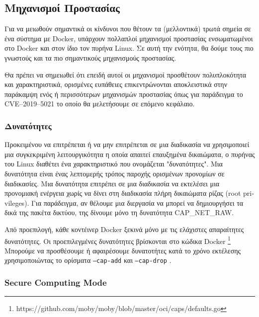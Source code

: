 \subsection{Μηχανισμοί Προστασίας}

Για να μειωθούν σημαντικά οι κίνδυνοι που θέτουν τα (μελλοντικά) τρωτά σημεία
σε ένα σύστημα με \textlatin{Docker}, υπάρχουν πολλαπλοί μηχανισμοί προστασίας
ενσωματωμένοι στο \textlatin{Docker} και στον ίδιο τον πυρήνα \textlatin{Linux}.
Σε αυτή την ενότητα, θα δούμε τους πιο γνωστούς και τα πιο σημαντικούς
μηχανισμούς προστασίας.

Θα πρέπει να σημειωθεί ότι επειδή αυτοί οι μηχανισμοί προσθέτουν πολυπλοκότητα
και χαρακτηριστικά, ορισμένες ευπάθειες επικεντρώνονται αποκλειστικά στην
παράκαμψη ενός ή περισσότερων μηχανισμών προστασίας όπως για παράδειγμα το
\textlatin{CVE–2019–5021} το οποίο θα μελετήσουμε σε επόμενο κεφάλαιο.

\subsubsection{Δυνατότητες}

Προκειμένου να επιτρέπεται ή να μην επιτρέπεται σε μια διαδικασία να χρησιμοποιεί μια
συγκεκριμένη λειτουργικότητα η οποία απαιτεί επαυξημένα δικαιώματα,
ο πυρήνας του \textlatin{Linux} διαθέτει ένα χαρακτηριστικό που ονομάζεται
"δυνατότητες". Μια δυνατότητα είναι ένας λεπτομερής τρόπος παροχής ορισμένων
προνομίων σε διαδικασίες. Μια δυνατότητα επιτρέπει σε μια διαδικασία να
εκτελέσει μια προνομιακή ενέργεια χωρίς να δίνει στη διαδικασία πλήρη
δικαιώματα ρίζας (\textlatin{root privileges}). Για παράδειγμα, αν θέλουμε μια
διεργασία να μπορεί να δημιουργήσει τα δικά της πακέτα δικτύου, της δίνουμε
μόνο τη δυνατότητα \textlatin{CAP\_NET\_RAW}.

Από προεπιλογή, κάθε κοντέινερ \textlatin{Docker} ξεκινά μόνο με τις ελάχιστες
απαραίτητες δυνατότητες. Οι προεπιλεγμένες δυνατότητες βρίσκονται στο κώδικα
\textlatin{Docker}
\footnote{\textlatin{https://github.com/moby/moby/blob/master/oci/caps/defaults.go}}
Μπορούμε να προσθέσουμε ή αφαιρέσουμε δυνατοτήτες κατά το χρόνο εκτέλεσης
χρησιμοποιώντας το ορίσματα \texttt{\textlatin{--cap-add}} και
\texttt{\textlatin{--cap-drop}} \cite{More-Secure-Non-Root-Container}.

\subsubsection{\textlatin{Secure Computing Mode}}

